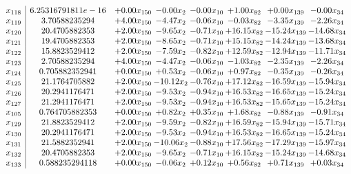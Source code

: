 \documentclass[8pt]{article}
\begin{document}
\[\begin{array}{c| c c@{\hskip 2pt} c@{\hskip 2pt} c@{\hskip 2pt} c@{\hskip 2pt} c@{\hskip 2pt} c@{\hskip 2pt} }
 x_{118}   &  6.25316791811e-16 & +  0.00 x_{150} & -0.00 x_{2} & -0.00 x_{10} & +  1.00 x_{82} & +  0.00 x_{139} & -0.00 x_{34}\\
 x_{119}   &  3.70588235294 & +  4.00 x_{150} & -4.47 x_{2} & -0.06 x_{10} & -0.03 x_{82} & -3.35 x_{139} & -2.26 x_{34}\\
 x_{120}   &  20.4705882353 & +  2.00 x_{150} & -9.65 x_{2} & -0.71 x_{10} & + 16.15 x_{82} & -15.24 x_{139} & -14.68 x_{34}\\
 x_{121}   &  19.4705882353 & +  2.00 x_{150} & -8.65 x_{2} & -0.71 x_{10} & + 15.15 x_{82} & -14.24 x_{139} & -13.68 x_{34}\\
 x_{122}   &  15.8823529412 & +  2.00 x_{150} & -7.59 x_{2} & -0.82 x_{10} & + 12.59 x_{82} & -12.94 x_{139} & -11.71 x_{34}\\
 x_{123}   &  2.70588235294 & +  4.00 x_{150} & -4.47 x_{2} & -0.06 x_{10} & -1.03 x_{82} & -2.35 x_{139} & -2.26 x_{34}\\
 x_{124}   &  0.705882352941 & +  0.00 x_{150} & +  0.53 x_{2} & -0.06 x_{10} & +  0.97 x_{82} & -0.35 x_{139} & -0.26 x_{34}\\
 x_{125}   &  21.1764705882 & +  2.00 x_{150} & -10.12 x_{2} & -0.76 x_{10} & + 17.12 x_{82} & -16.59 x_{139} & -15.94 x_{34}\\
 x_{126}   &  20.2941176471 & +  2.00 x_{150} & -9.53 x_{2} & -0.94 x_{10} & + 16.53 x_{82} & -16.65 x_{139} & -15.24 x_{34}\\
 x_{127}   &  21.2941176471 & +  2.00 x_{150} & -9.53 x_{2} & -0.94 x_{10} & + 16.53 x_{82} & -15.65 x_{139} & -15.24 x_{34}\\
 x_{105}   &  0.764705882353 & +  0.00 x_{150} & +  0.82 x_{2} & +  0.35 x_{10} & +  1.68 x_{82} & -0.88 x_{139} & -0.91 x_{34}\\
 x_{129}   &  21.8823529412 & +  2.00 x_{150} & -9.59 x_{2} & -0.82 x_{10} & + 16.59 x_{82} & -15.94 x_{139} & -15.71 x_{34}\\
 x_{130}   &  20.2941176471 & +  2.00 x_{150} & -9.53 x_{2} & -0.94 x_{10} & + 16.53 x_{82} & -16.65 x_{139} & -15.24 x_{34}\\
 x_{131}   &  21.5882352941 & +  2.00 x_{150} & -10.06 x_{2} & -0.88 x_{10} & + 17.56 x_{82} & -17.29 x_{139} & -15.97 x_{34}\\
 x_{132}   &  20.4705882353 & +  2.00 x_{150} & -9.65 x_{2} & -0.71 x_{10} & + 16.15 x_{82} & -15.24 x_{139} & -14.68 x_{34}\\
 x_{133}   &  0.588235294118 & +  0.00 x_{150} & -0.06 x_{2} & +  0.12 x_{10} & +  0.56 x_{82} & +  0.71 x_{139} & +  0.03 x_{34}\\

\end{array}\]
\end{document}
